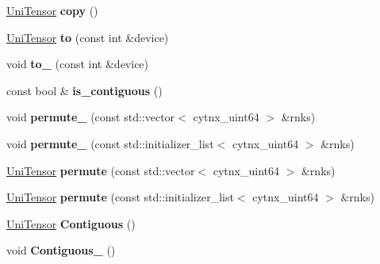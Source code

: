 \begin{DoxyCompactItemize}
\hyperlink{classcytnx_1_1UniTensor}{Uni\+Tensor} {\bfseries copy} ()
\item 
\mbox{\label{classcytnx_1_1UniTensor_ad9a183cf5f2fdd8634420e12b093e863}} 
\hyperlink{classcytnx_1_1UniTensor}{Uni\+Tensor} {\bfseries to} (const int \&device)
\item 
\mbox{\label{classcytnx_1_1UniTensor_a9aa08f2c848cc7d31bceac7656b4a976}} 
void {\bfseries to\+\_\+} (const int \&device)
\item 
\mbox{\label{classcytnx_1_1UniTensor_a212dae7b33e323ebc5f49aa8f0fcb21e}} 
const bool \& {\bfseries is\+\_\+contiguous} ()
\item 
\mbox{\label{classcytnx_1_1UniTensor_a1ef00558c40ad9aa93251a787456ea6e}} 
void {\bfseries permute\+\_\+} (const std\+::vector$<$ cytnx\+\_\+uint64 $>$ \&rnks)
\item 
\mbox{\label{classcytnx_1_1UniTensor_ad698cb553a5cdcd7dde08d2ad69fb31a}} 
void {\bfseries permute\+\_\+} (const std\+::initializer\+\_\+list$<$ cytnx\+\_\+uint64 $>$ \&rnks)
\item 
\mbox{\label{classcytnx_1_1UniTensor_ae0286725bab36103ed7b031376d102fc}} 
\hyperlink{classcytnx_1_1UniTensor}{Uni\+Tensor} {\bfseries permute} (const std\+::vector$<$ cytnx\+\_\+uint64 $>$ \&rnks)
\item 
\mbox{\label{classcytnx_1_1UniTensor_aacf879e6b64096131b123f30d0410420}} 
\hyperlink{classcytnx_1_1UniTensor}{Uni\+Tensor} {\bfseries permute} (const std\+::initializer\+\_\+list$<$ cytnx\+\_\+uint64 $>$ \&rnks)
\item 
\mbox{\label{classcytnx_1_1UniTensor_a568579dd1627065271e2705df9e66d51}} 
\hyperlink{classcytnx_1_1UniTensor}{Uni\+Tensor} {\bfseries Contiguous} ()
\item 
\mbox{\label{classcytnx_1_1UniTensor_af15d2e70d66bfad1e0292d8fa9436508}} 
void {\bfseries Contiguous\+\_\+} ()
\item 
\mbox{\label{classcytnx_1_1UniTensor_a914cb4b63628e9b8e428f6c6d655bd77}} 

\end{DoxyCompactItemize}
